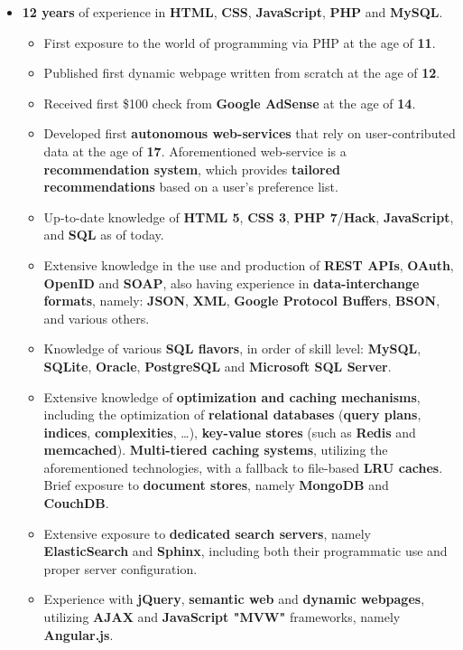 \documentclass[11pt,a4paper,sans]{moderncv}
\begin{document}
	\begin{itemize}
	\item	\label{webdev}  \textbf{12 years} of experience in \textbf{HTML}, \textbf{CSS}, \textbf{JavaScript}, \textbf{PHP} and \textbf{MySQL}.
		\begin{itemize}
		\item	First exposure to the world of programming via PHP at the age of \textbf{11}.
		\item	Published first dynamic webpage written from scratch at the age of \textbf{12}.
		\item	Received first \$100 check from \textbf{Google AdSense} at the age of \textbf{14}.
		\item	Developed first \textbf{autonomous web-services} that rely on user-contributed data at the age of \textbf{17}. Aforementioned web-service is a \textbf{recommendation system}, which provides \textbf{tailored recommendations} based on a user's preference list.
		\item	Up-to-date knowledge of \textbf{HTML 5}, \textbf{CSS 3}, \textbf{PHP 7}/\textbf{Hack}, \textbf{JavaScript}, and \textbf{SQL} as of today.
		\item	Extensive knowledge in the use and production of \textbf{REST APIs}, \textbf{OAuth}, \textbf{OpenID} and \textbf{SOAP}, also having experience in \textbf{data-interchange formats}, namely: \textbf{JSON}, \textbf{XML}, \textbf{Google Protocol Buffers}, \textbf{BSON}, and various others.
		\item	Knowledge of various \textbf{SQL flavors}, in order of skill level: \textbf{MySQL}, \textbf{SQLite}, \textbf{Oracle}, \textbf{PostgreSQL} and \textbf{Microsoft SQL Server}.
		\item	Extensive knowledge of \textbf{optimization and caching mechanisms}, including the optimization of \textbf{relational databases} (\textbf{query plans}, \textbf{indices}, \textbf{complexities}, \ldots), \textbf{key-value stores} (such as \textbf{Redis} and \textbf{memcached}). \textbf{Multi-tiered caching systems}, utilizing the aforementioned technologies, with a fallback to file-based \textbf{LRU caches}. Brief exposure to \textbf{document stores}, namely \textbf{MongoDB} and \textbf{CouchDB}.
		\item	Extensive exposure to \textbf{dedicated search servers}, namely \textbf{ElasticSearch} and \textbf{Sphinx}, including both their programmatic use and proper server configuration. 
		\item	Experience with \textbf{jQuery}, \textbf{semantic web} and \textbf{dynamic webpages}, utilizing \textbf{AJAX} and \textbf{JavaScript "MVW"} frameworks, namely \textbf{Angular.js}.

\end{itemize}
\end{itemize}
\end{document}
